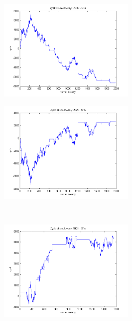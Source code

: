 \documentclass{tewiart}
\begin{document}
\FloatBarrier
\begin{figure}[h]
\centering
\begin{minipage}{\linewidth}
\centering
\includegraphics[width=0.6\textwidth]{images/usdcadS1a.png}
\label{jedno}
\end{minipage}
\begin{minipage}{\linewidth}
\centering
\includegraphics[width=0.6\textwidth]{images/usdcadS1b.png}
\label{dwu}
\end{minipage}
\\
\begin{minipage}{\linewidth}
\centering
\includegraphics[width=0.6\textwidth]{images/usdcadS1c.png}
\label{cztero}
\end{minipage}

\end{figure}
\end{document}
